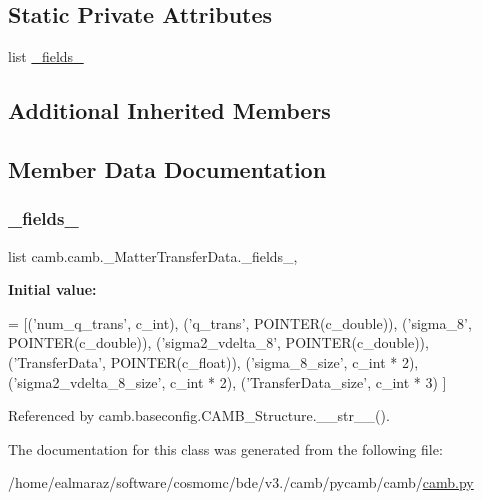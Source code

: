 \subsection*{Static Private Attributes}
\begin{DoxyCompactItemize}
\item 
list \mbox{\hyperlink{classcamb_1_1camb_1_1__MatterTransferData_afaef40925564055c9603b2002adce25c}{\+\_\+fields\+\_\+}}
\end{DoxyCompactItemize}
\subsection*{Additional Inherited Members}


\subsection{Member Data Documentation}
\mbox{\label{classcamb_1_1camb_1_1__MatterTransferData_afaef40925564055c9603b2002adce25c}} 
\subsubsection{\texorpdfstring{\+\_\+fields\+\_\+}{\_fields\_}}
{\footnotesize\ttfamily list camb.\+camb.\+\_\+\+Matter\+Transfer\+Data.\+\_\+fields\+\_\+\hspace{0.3cm}{\ttfamily [static]}, {\ttfamily [private]}}

{\bfseries Initial value\+:}
\begin{DoxyCode}
=  [(\textcolor{stringliteral}{'num\_q\_trans'}, c\_int),
                (\textcolor{stringliteral}{'q\_trans'}, POINTER(c\_double)),
                (\textcolor{stringliteral}{'sigma\_8'}, POINTER(c\_double)),
                (\textcolor{stringliteral}{'sigma2\_vdelta\_8'}, POINTER(c\_double)),
                (\textcolor{stringliteral}{'TransferData'}, POINTER(c\_float)),
                (\textcolor{stringliteral}{'sigma\_8\_size'}, c\_int * 2),
                (\textcolor{stringliteral}{'sigma2\_vdelta\_8\_size'}, c\_int * 2),
                (\textcolor{stringliteral}{'TransferData\_size'}, c\_int * 3)
                ]
\end{DoxyCode}


Referenced by camb.\+baseconfig.\+C\+A\+M\+B\+\_\+\+Structure.\+\_\+\+\_\+str\+\_\+\+\_\+().



The documentation for this class was generated from the following file\+:\begin{DoxyCompactItemize}
\item 
/home/ealmaraz/software/cosmomc/bde/v3./camb/pycamb/camb/\mbox{\hyperlink{camb_8py}{camb.\+py}}\end{DoxyCompactItemize}
